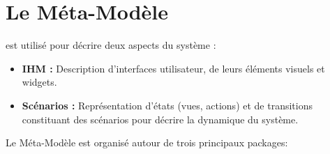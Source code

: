\section{Le Méta-Modèle \kwcinematic{}}

\kwcinematic{} est utilisé pour décrire deux aspects du système :
\begin{itemize}
\item \textbf{IHM :} Description d'interfaces utilisateur, de leurs éléments visuels et widgets.
\item \textbf{Scénarios :} Représentation d'états (vues, actions) et de transitions constituant des scénarios pour décrire la dynamique du système.
\\
\end{itemize}

Le Méta-Modèle \kwcinematic{} est organisé autour de trois principaux packages:
